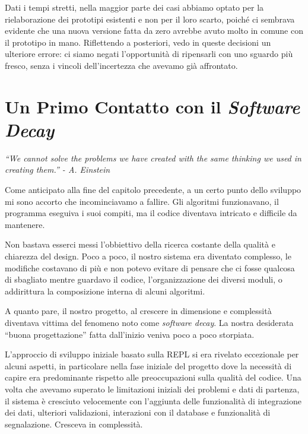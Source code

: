 \documentclass[12pt]{report}
\begin{document}
Dati i tempi stretti, nella maggior parte dei casi abbiamo optato per
la rielaborazione dei prototipi esistenti e non per il loro scarto,
poiché ci sembrava evidente che una nuova versione fatta da zero avrebbe avuto
molto in comune con il prototipo in mano. Riflettendo a posteriori, vedo
in queste decisioni un ulteriore errore: ci siamo negati l'opportunità 
di ripensarli con uno sguardo più fresco, senza i vincoli 
dell'incertezza che avevamo già affrontato. 

% 
%
%
\chapter{Un Primo Contatto con il \textit{Software Decay}}
\label{cap:software_decay}

\vspace{1cm}
\begin{flushright}
	\textit{
	``We cannot solve the problems we have created
	with the same thinking we used in creating them.'' - A. Einstein
	}
\end{flushright}
\vspace{1cm}

Come anticipato alla fine del capitolo precedente, a un certo punto
dello sviluppo mi sono accorto che incominciavamo a fallire. 
Gli algoritmi funzionavano, il programma eseguiva i suoi compiti, ma il
codice diventava intricato e difficile da mantenere.

Non bastava esserci messi l'obbiettivo della ricerca costante della qualità e 
chiarezza del design. Poco a poco, il nostro sistema era diventato complesso, 
le modifiche costavano di più e non potevo evitare di pensare che ci fosse 
qualcosa di sbagliato mentre guardavo il codice, l'organizzazione dei diversi 
moduli, o addirittura la composizione interna di alcuni algoritmi. 

A quanto pare, il nostro progetto, al crescere in dimensione e complessità 
diventava vittima del fenomeno noto come \textit{software decay}.
La nostra desiderata ``buona progettazione'' fatta 
dall'inizio veniva poco a poco storpiata.

L'approccio di sviluppo iniziale basato sulla REPL si era rivelato eccezionale 
per alcuni aspetti, in particolare nella fase iniziale del progetto dove la 
necessità di capire era predominante rispetto alle preoccupazioni sulla 
qualità del codice. Una volta che avevamo superato le limitazioni iniziali dei 
problemi e dati di partenza, il sistema è cresciuto velocemente con l'aggiunta 
delle funzionalità di integrazione dei dati, ulteriori validazioni, interazioni 
con il database e funzionalità di segnalazione. Cresceva in complessità. 
\end{document}
